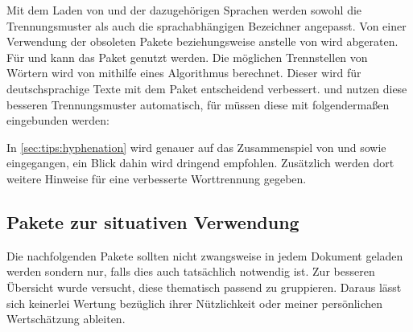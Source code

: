 \begin{DeclarePackages}
  Mit dem Laden von  und der dazugehörigen Sprachen werden 
  sowohl die Trennungsmuster als auch die sprachabhängigen Bezeichner angepasst.
  Von einer Verwendung der obsoleten Pakete  beziehungsweise 
   anstelle von  wird abgeraten. Für 
   und  kann das Paket  
  genutzt werden.
  Die möglichen Trennstellen von Wörtern wird von  mithilfe 
  eines Algorithmus berechnet. Dieser wird für deutschsprachige Texte mit dem 
  Paket  entscheidend verbessert.  und 
   nutzen diese besseren Trennungsmuster automatisch, für 
   müssen diese mit folgendermaßen eingebunden werden:
  \begin{Code}
    \usepackage[ngerman=ngerman-x-latest]{hyphsubst}
  \end{Code}\vspace{-\baselineskip}%
  In \autoref{sec:tips:hyphenation} wird genauer auf das Zusammenspiel von 
   und  sowie  eingegangen, 
  ein Blick dahin wird dringend empfohlen. Zusätzlich werden dort weitere 
  Hinweise für eine verbesserte Worttrennung gegeben.
\end{DeclarePackages}



\subsection{Pakete zur situativen Verwendung}
%
Die nachfolgenden Pakete sollten nicht zwangsweise in jedem Dokument geladen 
werden sondern nur, falls dies auch tatsächlich notwendig ist. Zur besseren 
Übersicht wurde versucht, diese thematisch passend zu gruppieren. Daraus lässt 
sich keinerlei Wertung bezüglich ihrer Nützlichkeit oder meiner persönlichen 
Wertschätzung ableiten.



